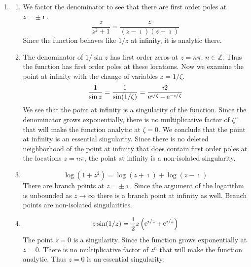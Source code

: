 {\begin{Solution}
  \label{solution classify z z2+1}
\begin{enumerate}
\item 
  \begin{enumerate}
  \item 
    We factor the denominator to see that there are first order poles at 
    $z = \pm \imath$.
    \[
    \frac{z}{z^2 + 1} = \frac{z}{(z - \imath) (z + \imath)}
    \]
    Since the function behaves like $1/z$ at infinity, it is analytic there.
  \item 
    The denominator of $1 / \sin z$ has first order zeros at $z = n \pi$,
    $n \in \mathbb{Z}$.
    Thus the function has first order poles at these locations.
    Now we examine the point at infinity with the change of variables
    $z = 1 / \zeta$.
    \[
    \frac{1}{\sin z} = \frac{1}{ \sin(1 / \zeta)} = \frac{\imath 2}{\mathop{\mathrm{e}}\nolimits^{\imath / \zeta} - \mathop{\mathrm{e}}\nolimits^{-\imath / \zeta}}
    \]
    We see that the point at infinity is a singularity of the function.
    Since the denominator grows exponentially, there is no multiplicative
    factor of $\zeta^n$ that will make the function analytic at $\zeta = 0$.  We conclude
    that the point at infinity is an essential singularity.  Since there is
    no deleted neighborhood of the point at infinity that does contain
    first order poles at the locations $z = n \pi$, the point at infinity is
    a non-isolated singularity.
  \item 
    \[
    \log \left( 1 + z^2 \right) = \log(z + \imath) + \log(z - \imath)
    \]
    There are branch points at $z = \pm \imath$.  Since the argument of the logarithm
    is unbounded as $z \to \infty$ there is a branch point at infinity as well.
    Branch points are non-isolated singularities.
  \item 
    \[
    z \sin(1/z) = \frac{1}{2} z \left( \mathop{\mathrm{e}}\nolimits^{\imath / z} + \mathop{\mathrm{e}}\nolimits^{\imath / z} \right)
    \]
    The point $z = 0$ is a singularity.  Since the function grows 
    exponentially at $z = 0$.  There is no multiplicative factor of $z^n$
    that will make the function analytic.  Thus $z = 0$ is an essential
    singularity.
    

\end{enumerate}
\end{enumerate}
\end{Solution}}
